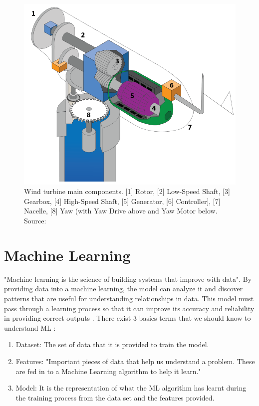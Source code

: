 \begin{figure}[htbp]
	\centering
	\includegraphics[scale=0.5]{Chapters/Figures/background_fig8.PNG}
	\caption{Wind turbine main components. [1] Rotor, [2] Low-Speed Shaft, [3] Gearbox, [4] High-Speed Shaft, [5] Generator, [6] Controller], [7] Nacelle, [8] Yaw (with Yaw Drive above and Yaw Motor below. Source: \cite{OLD_29_WIND} }
	\label{fig:Figuras_Tree_silhouettes-vectorial}
\end{figure}


\section{Machine Learning} 
\label{sub:if_you_use_this_template} 

"Machine learning is the science of building systems that improve with data"\cite{FCT_AA}. By providing data into a machine learning, the model can analyze it and discover patterns that are useful for understanding relationships in data. This model must pass through a learning process so that it can improve its accuracy and reliability in providing correct outputs \cite{OLD_15_WIND} \cite{46_ML}. There exist 3 basics terms that we should know to understand ML \cite{46_ML}:
\begin{enumerate}
    \item{Dataset:}
The set of data that it is provided to train the model.
    \item{Features:}
"Important pieces of data that help us understand a problem. These are fed in to a Machine Learning algorithm to help it learn."
    \item{Model:}
It is the representation of what the ML algorithm has learnt during the training process from the data set and the features provided.
\end{enumerate}

